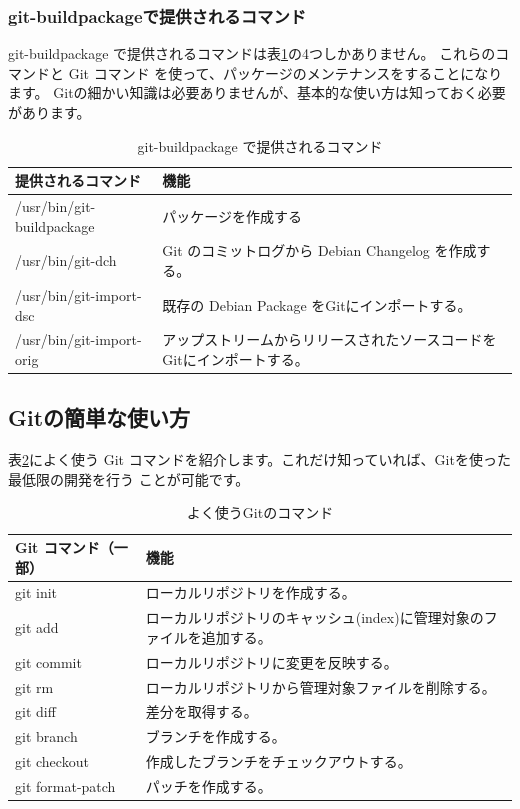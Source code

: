 \documentclass[mingoth,a4paper]{jsarticle}
\begin{document}
\subsubsection{git-buildpackageで提供されるコマンド}
git-buildpackage で提供されるコマンドは表\ref{git-buildpackage-command}の4つしかありません。
これらのコマンドと Git コマンド を使って、パッケージのメンテナンスをすることになります。
Gitの細かい知識は必要ありませんが、基本的な使い方は知っておく必要があります。
   \begin{table}[h]
    \begin{center}
      {
        \begin{tabular}{l|l} \hline
                提供されるコマンド & 機能 \\ \hline \hline
/usr/bin/git-buildpackage & パッケージを作成する \\
/usr/bin/git-dch & Git のコミットログから Debian Changelog を作成する。\\
/usr/bin/git-import-dsc & 既存の Debian Package をGitにインポートする。\\
/usr/bin/git-import-orig & アップストリームからリリースされたソースコードをGitにインポートする。\\
           \end{tabular}
        }
     \caption{git-buildpackage で提供されるコマンド}
     \label{git-buildpackage-command}
    \end{center}
    \end{table}

\subsection{Gitの簡単な使い方}
表\ref{git-command}によく使う Git コマンドを紹介します。これだけ知っていれば、Gitを使った最低限の開発を行う
ことが可能です。
   \begin{table}[h]
    \begin{center}
      {
        \begin{tabular}{l|l} \hline
                Git コマンド（一部） & 機能 \\ \hline \hline
git init & ローカルリポジトリを作成する。\\
git add & ローカルリポジトリのキャッシュ(index)に管理対象のファイルを追加する。\\
git commit & ローカルリポジトリに変更を反映する。\\
git rm & ローカルリポジトリから管理対象ファイルを削除する。\\
git diff & 差分を取得する。\\
git branch & ブランチを作成する。\\
git checkout & 作成したブランチをチェックアウトする。\\
git format-patch & パッチを作成する。\\
           \end{tabular}
        }
     \caption{よく使うGitのコマンド}
     \label{git-command}
    \end{center}
    \end{table}
\end{document}
